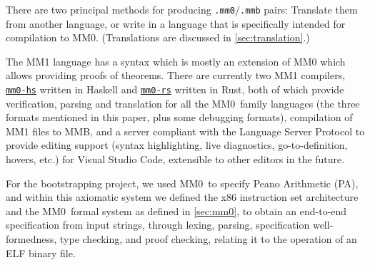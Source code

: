 \documentclass[runningheads]{llncs}
\newcommand{\mmO}{\textsf{MM0}}
\begin{document}
There are two principal methods for producing \texttt{.mm0}/\texttt{.mmb} pairs: Translate them from another language, or write in a language that is specifically intended for compilation to \mmO. (Translations are discussed in \autoref{sec:translation}.)

The \textsf{MM1} language has a syntax which is mostly an extension of \textsf{MM0} which allows providing proofs of theorems. There are currently two \textsf{MM1} compilers, \href{https://github.com/digama0/mm0/blob/master/mm0-hs/}{\texttt{mm0-hs}} written in Haskell and \href{https://github.com/digama0/mm0/blob/master/mm0-rs/}{\texttt{mm0-rs}} written in Rust, both of which provide verification, parsing and translation for all the \mmO\ family languages (the three formats mentioned in this paper, plus some debugging formats), compilation of \textsf{MM1} files to \textsf{MMB}, and a server compliant with the Language Server Protocol to provide editing support (syntax highlighting, live diagnostics, go-to-definition, hovers, etc.) for Visual Studio Code, extensible to other editors in the future.

For the bootstrapping project, we used \mmO\ to specify Peano Arithmetic (PA), and within this axiomatic system we defined the x86 instruction set architecture \cite{Carn19} and the \mmO\ formal system as defined in \autoref{sec:mm0}, to obtain an end-to-end specification from input strings, through lexing, parsing, specification well-formedness, type checking, and proof checking, relating it to the operation of an ELF binary file.
\end{document}
